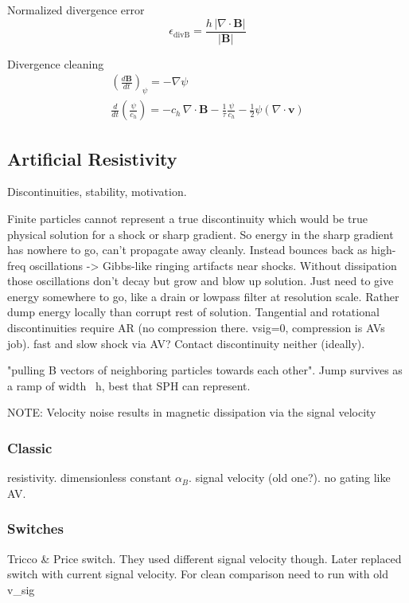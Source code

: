 Normalized divergence error
\begin{equation}
\epsilon_{\mathrm{divB}} = \frac{h\,|\nabla\cdot\mathbf{B}|}{|\mathbf{B}|}
\end{equation}

Divergence cleaning
\begin{align}
\left(\frac{d\mathbf{B}}{dt}\right)_\psi = -\nabla\psi \\
\frac{d}{dt}\!\left(\frac{\psi}{c_h}\right) = -c_h\,\nabla\cdot\mathbf{B} - \frac{1}{\tau}\frac{\psi}{c_h} - \frac{1}{2}\psi(\nabla\cdot\mathbf{v})
\end{align}



\subsection{Artificial Resistivity} 
Discontinuities, stability, motivation. 

Finite particles cannot represent a true discontinuity which would be true physical solution for a shock or sharp gradient. So energy in the sharp gradient has nowhere to go, can't propagate away cleanly. Instead bounces back as high-freq oscillations -> Gibbs-like ringing artifacts near shocks. Without dissipation those oscillations don't decay but grow and blow up solution. Just need to give energy somewhere to go, like a drain or lowpass filter at resolution scale. Rather dump energy locally than corrupt rest of solution. Tangential and rotational discontinuities require AR (no compression there. vsig=0, compression is AVs job). fast and slow shock via AV? Contact discontinuity neither (ideally). 

"pulling B vectors of neighboring particles towards each other". Jump survives as a ramp of width ~h, best that SPH can represent.

NOTE: Velocity noise results in magnetic dissipation via the signal velocity

\subsubsection{Classic}
resistivity. dimensionless constant $\alpha_B$. signal velocity (old one?). no gating like AV. 

\subsubsection{Switches}
Tricco \& Price switch. They used different signal velocity though. Later replaced switch with current signal velocity. For clean comparison need to run with old v\_sig

